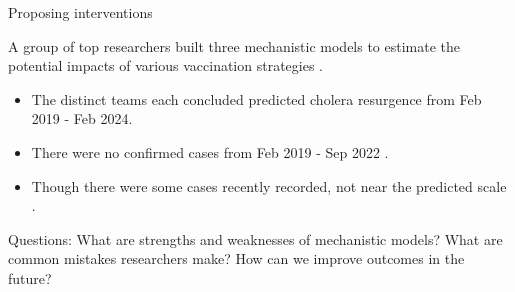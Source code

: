 \documentclass[aspectratio=169]{beamer}\usepackage[]{graphicx}\usepackage[]{xcolor}
\begin{document}

\begin{frame}{Proposing interventions}

A group of top researchers built three mechanistic models to estimate the potential impacts of various vaccination strategies \citep{lee20}.

\begin{itemize}
  \item The distinct teams each concluded predicted cholera resurgence from Feb 2019 - Feb 2024. 
  \item There were no confirmed cases from Feb 2019 - Sep 2022 \citep{trevisin22}. 
  \item Though there were some cases recently recorded, not near the predicted scale \citep{PAHO23}.
\end{itemize}

\alert{Questions:} What are strengths and weaknesses of mechanistic models? What are common mistakes researchers make? How can we improve outcomes in the future?

\end{frame}
\end{document}
